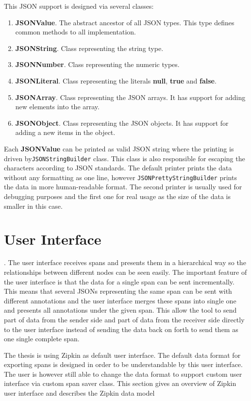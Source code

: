 This JSON support is designed via several classes:
\begin{enumerate}
	\item \textbf{JSONValue}. The abstract ancestor of all JSON types. This type defines common methods to all implementation.
	\item \textbf{JSONString}. Class representing the string type.
	\item \textbf{JSONNumber}. Class representing the numeric types.
	\item \textbf{JSONLiteral}. Class representing the literals \textbf{null}, \textbf{true} and \textbf{false}.
	\item \textbf{JSONArray}. Class representing the JSON arrays. It has support for adding new elements into the array.
	\item \textbf{JSONObject}. Class representing the JSON objects. It has support for adding a new items in the object.
\end{enumerate}

Each \textbf{JSONValue} can be printed as valid JSON string where the printing is driven by\texttt{JSONStringBuilder} class. This class is also responsible for escaping the characters according to JSON standards. The default printer prints the data without any formatting as one line, however \texttt{JSONPrettyStringBuilder} prints the data in more human-readable format. The second printer is usually used for debugging purposes and the first one for real usage as the size of the data is smaller in this case.

\section{User Interface}
\label{sec:zipkin_ui}.
The user interface receives spans and presents them in a hierarchical way so the relationships between different nodes can be seen easily. The important feature of the user interface is that the data for a single span can be sent incrementally. This means that several JSONs representing the same span can be sent with different annotations and the user interface merges these spans into single one and presents all annotations under the given span. This allow the tool to send part of data from the sender side and part of data from the receiver side directly to the user interface instead of sending the data back on forth to send them as one single complete span.

The thesis is using Zipkin as default user interface. The default data format for exporting spans is designed in order to be understandable by this user interface. The user is however still able to change the data format to support custom user interface via custom span saver class. This section gives an overview of Zipkin user interface and describes the Zipkin data model


